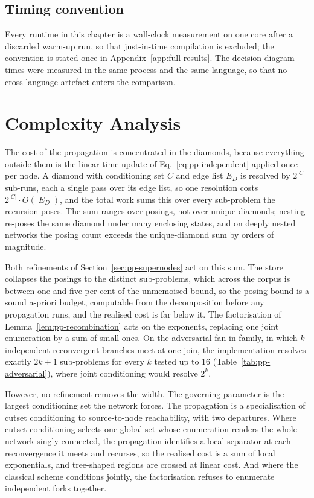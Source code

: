 \documentclass[12pt]{report}
\begin{document}
\subsection{Timing convention}
\label{sec:pp-timing}

Every runtime in this chapter is a wall-clock measurement on one core after a discarded
warm-up run, so that just-in-time compilation is excluded; the convention is stated once in
Appendix~\ref{app:full-results}. The decision-diagram times were measured in the same
process and the same language, so that no cross-language artefact enters the comparison.

\section{Complexity Analysis}
\label{sec:pp-complexity}

The cost of the propagation is concentrated in the diamonds, because everything outside them
is the linear-time update of Eq.~\eqref{eq:pp-independent} applied once per node. A diamond
with conditioning set $C$ and edge list $E_D$ is resolved by $2^{|C|}$ sub-runs, each a single
pass over its edge list, so one resolution costs $2^{|C|} \cdot O(|E_D|)$, and the total work
sums this over every sub-problem the recursion poses. The sum ranges over posings, not over
unique diamonds; nesting re-poses the same diamond under many enclosing states, and on
deeply nested networks the posing count exceeds the unique-diamond sum by orders of
magnitude.

Both refinements of Section~\ref{sec:pp-supernodes} act on this sum. The store collapses the
posings to the distinct sub-problems, which across the corpus is between one and five per
cent of the unmemoised bound, so the posing bound is a sound a-priori budget, computable
from the decomposition before any propagation runs, and the realised cost is far below it.
The factorisation of Lemma~\ref{lem:pp-recombination} acts on the exponents, replacing one
joint enumeration by a sum of small ones. On the adversarial fan-in family, in which $k$
independent reconvergent branches meet at one join, the implementation resolves exactly
$2k+1$ sub-problems for every $k$ tested up to 16 (Table~\ref{tab:pp-adversarial}), where
joint conditioning would resolve $2^k$.

However, no refinement removes the width. The governing parameter is the largest
conditioning set the network forces. The propagation is a specialisation of cutset
conditioning \cite{pearl1988probabilistic} to source-to-node reachability, with two
departures. Where cutset conditioning selects one global set whose enumeration renders the
whole network singly connected, the propagation identifies a local separator at each
reconvergence it meets and recurses, so the realised cost is a sum of local exponentials,
and tree-shaped regions are crossed at linear cost. And where the classical scheme conditions
jointly, the factorisation refuses to enumerate independent forks together.
\end{document}
